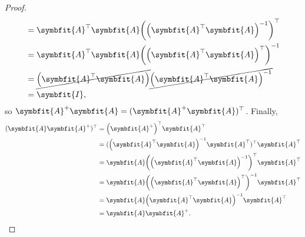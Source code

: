 \documentclass{article}
\theoremstyle{definition}
\newcommand{\mat}[1]{\symbfit{#1}}
\begin{document}
\begin{enumerate}[leftmargin=\labelsep]
\begin{proof}
\begin{align*}
			                              & = \mat{A}^{\top} \mat{A} \qty(\qty(\mat{A}^{\top}\mat{A})^{-1})^{\top}             \\
			                              & = \mat{A}^{\top} \mat{A} \qty(\qty(\mat{A}^{\top}\mat{A})^{\top})^{-1}             \\
			                              & = \cancel{\qty(\mat{A}^{\top} \mat{A})} \cancel{\qty(\mat{A}^{\top} \mat{A})^{-1}} \\
			                              & = \mat{I},
		      \end{align*}
		      so \(\mat{A}^+\mat{A}= (\mat{A}^+\mat{A})^\top\).
		      Finally,
		      \begin{align*}
			      (\mat{A}\mat{A}^+)^\top & = \qty(\mat{A}^+)^{\top}\mat{A}^\top                                  \\
			                              & = (\qty(\mat{A}^{\top}\mat{A})^{-1}\mat{A}^{\top})^{\top}\mat{A}^\top \\
			                              & = \mat{A}\qty(\qty(\mat{A}^{\top}\mat{A})^{-1})^{\top}\mat{A}^\top    \\
			                              & = \mat{A}\qty(\qty(\mat{A}^{\top}\mat{A})^{\top})^{-1}\mat{A}^\top    \\
			                              & = \mat{A}\qty(\mat{A}^{\top}\mat{A})^{-1}\mat{A}^\top                 \\
			                              & =\mat{A}\mat{A}^+.
		      \end{align*}
	      \end{proof}


\end{enumerate}
\end{document}
